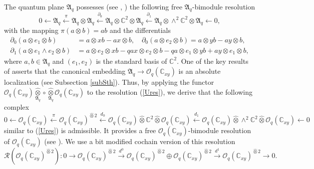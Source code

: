 \documentclass[12pt,reqno]{amsart}%
\theoremstyle{plain}
\numberwithin{theorem}{section} \numberwithin{equation}{section}
\numberwithin{lemma}{section}
\numberwithin{remark}{section}
\numberwithin{example}{section}
\numberwithin{proposition}{section}
\numberwithin{definition}{section}
\numberwithin{corollary}{section}
\begin{document}
The quantum plane $\mathfrak{A}_{q}$ possesses (see \cite{Tah}, \cite{WM}) the
following free $\mathfrak{A}_{q}$-bimodule resolution
\begin{equation}
0\leftarrow\mathfrak{A}_{q}\overset{\pi}{\longleftarrow}\mathfrak{A}%
_{q}\otimes\mathfrak{A}_{q}\overset{\partial_{0}}{\longleftarrow}%
\mathfrak{A}_{q}\otimes\mathbb{C}^{2}\otimes\mathfrak{A}_{q}\overset{\partial
_{1}}{\longleftarrow}\mathfrak{A}_{q}\otimes\wedge^{2}\mathbb{C}^{2}%
\otimes\mathfrak{A}_{q}\leftarrow0, \label{Ures}%
\end{equation}
with the mapping $\pi\left(  a\otimes b\right)  =ab$ and the differentials
\begin{align*}
\partial_{0}\left(  a\otimes e_{1}\otimes b\right)   &  =a\otimes xb-ax\otimes
b,\quad\partial_{0}\left(  a\otimes e_{2}\otimes b\right)  =a\otimes
yb-ay\otimes b,\\
\partial_{1}\left(  a\otimes e_{1}\wedge e_{2}\otimes b\right)   &  =a\otimes
e_{2}\otimes xb-qax\otimes e_{2}\otimes b-qa\otimes e_{1}\otimes yb+ay\otimes
e_{1}\otimes b,
\end{align*}
where $a,b\in\mathfrak{A}_{q}$ and $\left(  e_{1},e_{2}\right)  $ is the
standard basis of $\mathbb{C}^{2}$. One of the key results of \cite{Pir}
asserts that the canonical embedding $\mathfrak{A}_{q}\rightarrow
\mathcal{O}_{q}\left(  \mathbb{C}_{xy}\right)  $ is an absolute localization
(see Subsection \ref{subSth}). Thus, by applying the functor $\mathcal{O}%
_{q}\left(  \mathbb{C}_{xy}\right)  \underset{\mathfrak{A}_{q}%
}{\widehat{\otimes}}\circ\underset{\mathfrak{A}_{q}}{\widehat{\otimes}%
}\mathcal{O}_{q}\left(  \mathbb{C}_{xy}\right)  $ to the resolution
(\ref{Ures}), we derive that the following complex%
\[
0\leftarrow\mathcal{O}_{q}\left(  \mathbb{C}_{xy}\right)  \overset{\pi
}{\longleftarrow}\mathcal{O}_{q}\left(  \mathbb{C}_{xy}\right)
^{\widehat{\otimes}2}\overset{d_{0}}{\longleftarrow}\mathcal{O}_{q}\left(
\mathbb{C}_{xy}\right)  \widehat{\otimes}\mathbb{C}^{2}\widehat{\otimes
}\mathcal{O}_{q}\left(  \mathbb{C}_{xy}\right)  \overset{d_{1}}{\longleftarrow
}\mathcal{O}_{q}\left(  \mathbb{C}_{xy}\right)  \widehat{\otimes}\wedge
^{2}\mathbb{C}^{2}\widehat{\otimes}\mathcal{O}_{q}\left(  \mathbb{C}%
_{xy}\right)  \leftarrow0
\]
similar to (\ref{Ures}) is admissible. It provides a free $\mathcal{O}%
_{q}\left(  \mathbb{C}_{xy}\right)  $-bimodule resolution of $\mathcal{O}%
_{q}\left(  \mathbb{C}_{xy}\right)  $ (see \cite[3.2]{HelHom}). We use a bit
modified cochain version of this resolution
\[
\mathcal{R}\left(  \mathcal{O}_{q}\left(  \mathbb{C}_{xy}\right)
^{\widehat{\otimes}2}\right)  :0\rightarrow\mathcal{O}_{q}\left(
\mathbb{C}_{xy}\right)  ^{\widehat{\otimes}2}\overset{d^{0}}{\longrightarrow
}\mathcal{O}_{q}\left(  \mathbb{C}_{xy}\right)  ^{\widehat{\otimes}2}%
\oplus\mathcal{O}_{q}\left(  \mathbb{C}_{xy}\right)  ^{\widehat{\otimes}%
2}\overset{d^{1}}{\longrightarrow}\mathcal{O}_{q}\left(  \mathbb{C}%
_{xy}\right)  ^{\widehat{\otimes}2}\rightarrow0.
\]
\end{document}
